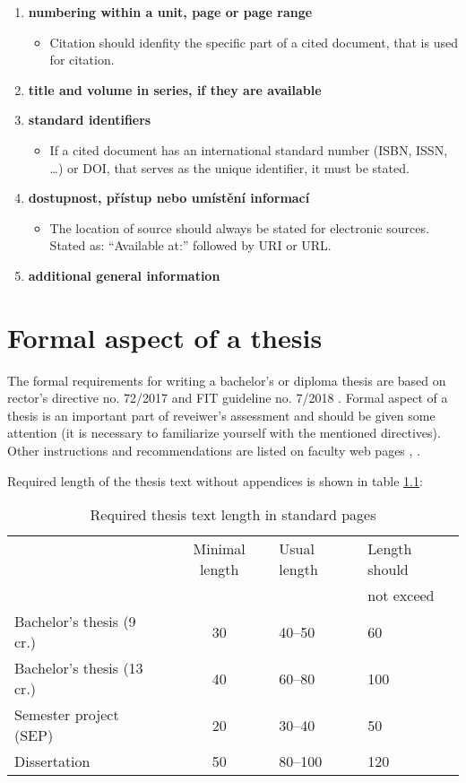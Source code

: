 \begin{enumerate}
\begin{itemize}
    \end{itemize}
    \item \textbf{numbering within a unit, page or page range}
    \begin{itemize}
        \item Citation should idenfity the specific part of a cited document, that is used for citation.
    \end{itemize}
    \item \textbf{title and volume in series, if they are available}
    \item \textbf{standard identifiers}
    \begin{itemize}
        \item If a cited document has an international standard number (ISBN, ISSN, \ldots) or DOI, that serves as the unique identifier, it must be stated.
    \end{itemize}
    \item \textbf{dostupnost, přístup nebo umístění informací}
    \begin{itemize}
        \item The location of source should always be stated for electronic sources. Stated as: ``Available at:'' followed by URI or URL.
    \end{itemize}
    \item \textbf{additional general information}
\end{enumerate}

\chapter{Formal aspect of a thesis}
\label{formality}

The formal requirements for writing a bachelor's or diploma thesis are based on rector's directive no. 72/2017 \cite{smernice} and FIT guideline no. 7/2018 \cite{smerniceFIT}. Formal aspect of a thesis is an important part of reveiwer's  assessment and should be given some attention (it is necessary to familiarize yourself with the mentioned directives). Other instructions and recommendations are listed on faculty web pages \cite{formalniBP}, \cite{formalniDP}.

Required length of the thesis text without appendices is shown in table \ref{rozsah}: 

\begin{table}[hbt]
\centering
\caption{Required thesis text length in standard pages}
\label{rozsah}
\begin{tabular}{|l|c|l|l|}
\hline
 & Minimal length & Usual length & Length should \\
 &  &  & not exceed  \\ \hline
Bachelor's thesis (9 cr.) & 30 & 40--50 & 60 \\ \hline
Bachelor's thesis (13 cr.) & 40 & 60--80 & 100 \\ \hline
Semester project (SEP) & 20 & 30--40 & 50 \\ \hline
Dissertation & 50 & 80--100 & 120 \\ \hline
\end{tabular}
\end{table}

